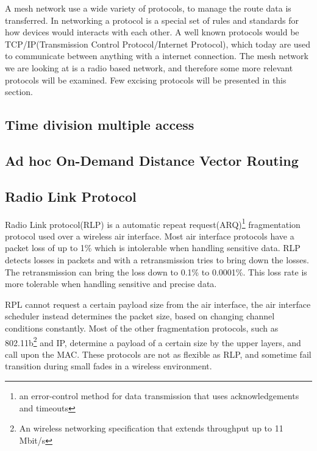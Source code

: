 A mesh network use a wide variety of protocols, to manage the route data is transferred.
In networking a protocol is a special set of rules and standards for how devices would interacts with each other.
A well known protocols would be TCP/IP(Transmission Control Protocol/Internet Protocol), which today are used to communicate between anything with a internet connection.
The mesh network we are looking at is a radio based network, and therefore some more relevant protocols will be examined. 
Few excising protocols will be presented in this section.

\subsection{Time division multiple access}

\subsection{Ad hoc On-Demand Distance Vector Routing}

\subsection{Radio Link Protocol}
Radio Link protocol(RLP) is a automatic repeat request(ARQ)\footnote{an error-control method for data transmission that uses acknowledgements and timeouts} fragmentation protocol used over a wireless air interface.
Most air interface protocols have a packet loss of up to 1\% which is intolerable when handling sensitive data.
RLP detects losses in packets and with a retransmission tries to bring down the losses.
The retransmission can bring the loss down to 0.1\% to 0.0001\%.
This loss rate is more tolerable when handling sensitive and precise data.

RPL cannot request a certain payload size from the air interface, the air interface scheduler instead determines the packet size, based on changing channel conditions constantly.
Most of the other fragmentation protocols, such as 802.11b\footnote{An wireless networking specification that extends throughput up to 11 Mbit/s} and IP, determine a payload of a certain size by the upper layers, and call upon the MAC.
These protocols are not as flexible as RLP, and sometime fail transition during small fades in a wireless environment. 